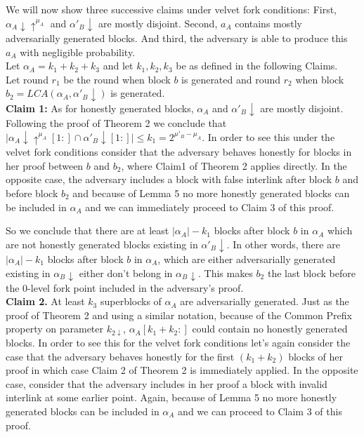 \documentclass[11pt,a4paper]{article}
\begin{document}
We will now show three successive claims under velvet fork conditions: First, $\alpha_A \downarrow \uparrow^{\mu_A}$ and $\alpha'_B \downarrow$ are mostly disjoint. Second, $a_A$ contains mostly adversarially generated blocks. And third, the adversary is able to produce this $a_A$ with negligible probability.\\
Let $\alpha_A = k_1 + k_2 + k_3$ and let $k_1, k_2, k_3$ be as defined in the following Claims.\\
Let round $r_1$ be the round when block $b$ is generated and round $r_2$ when block $b_2 = LCA(\alpha_A, \alpha'_B\downarrow)$ is generated.\\

\textbf{Claim 1:} As for honestly generated blocks, $\alpha_A$ and $ \alpha'_B\downarrow$ are mostly disjoint. Following the proof of Theorem 2 we conclude that $\vert \alpha_A\downarrow\uparrow^{\mu_A}[1:] \cap \alpha'_B\downarrow[1:] \vert \leq k_{1} = 2^{\mu'_B - \mu_A}$. In order to see this under the velvet fork conditions consider that the adversary behaves honestly for blocks in her proof between $b$ and $b_2$, where Claim1 of Theorem 2 applies directly. In the opposite case, the adversary includes a block with false interlink after block $b$ and before block $b_2$ and because of Lemma 5 no more honestly generated blocks can be included in $\alpha_A$ and we can immediately proceed to Claim 3 of this proof.

So we conclude that there are at least $\vert \alpha_A \vert - k_1$ blocks after block $b$ in $\alpha_A$ which are not honestly generated blocks existing in $\alpha'_B\downarrow$. In other words, there are $\vert \alpha_A \vert - k_1$ blocks after block $b$ in $\alpha_A$, which are either adversarially generated existing in $\alpha_B\downarrow$ either don't belong in $\alpha_B\downarrow$. This makes $b_2$ the last block before the 0-level fork point included in the adversary's proof.\\

\textbf{Claim 2.} 
At least $k_3$ superblocks of $\alpha_A$ are adversarially generated. Just as the proof of Theorem 2 and using a similar notation, because of the Common Prefix property on parameter $k_{2\downarrow}$, $\alpha_A[k_{1}+k_{2}:]$ could contain no honestly generated blocks. In order to see this for the velvet fork conditions let's again consider the case that the adversary behaves honestly for the first $(k_1 + k_2)$ blocks of her proof in which case Claim 2 of Theorem 2 is immediately applied. In the opposite case, consider that the adversary includes in her proof a block with invalid interlink at some earlier point. Again, because of Lemma 5 no more honestly generated blocks can be included in $\alpha_A$ and we can proceed to Claim 3 of this proof.
\end{document}
